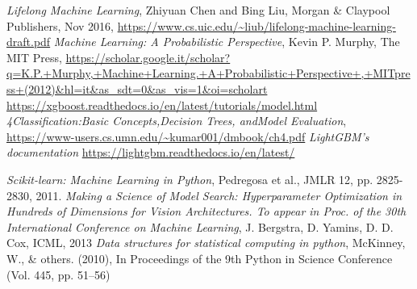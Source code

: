 \documentclass[a4paper, oneside, 11pt, openright]{book}
\begin{document}
\begin{thebibliography}{32}
			 \textit{Lifelong Machine Learning}, Zhiyuan Chen and Bing Liu, Morgan \& Claypool Publishers, Nov 2016, \url{https://www.cs.uic.edu/~liub/lifelong-machine-learning-draft.pdf}
			 \textit{Machine Learning: A Probabilistic Perspective}, Kevin P. Murphy, The MIT Press, \url{https://scholar.google.it/scholar?q=K.P.+Murphy,+Machine+Learning.+A+Probabilistic+Perspective+,+MITpress+(2012)&hl=it&as_sdt=0&as_vis=1&oi=scholart}
			 \url{https://xgboost.readthedocs.io/en/latest/tutorials/model.html}
			 \textit{4Classification:Basic Concepts,Decision Trees, andModel Evaluation}, \url{https://www-users.cs.umn.edu/~kumar001/dmbook/ch4.pdf}
			 \textit{LightGBM’s documentation} 
			\url{https://lightgbm.readthedocs.io/en/latest/}
			
			
			\textit{Scikit-learn: Machine Learning in Python}, Pedregosa et al., JMLR 12, pp. 2825-2830, 2011.
			\textit{Making a Science of Model Search: Hyperparameter Optimization in Hundreds of Dimensions for Vision Architectures. To appear in Proc. of the 30th International Conference on Machine Learning}, J. Bergstra, D. Yamins, D. D. Cox, ICML, 2013
			\textit{Data structures for statistical computing in python},
			McKinney, W., \& others. (2010), In Proceedings of the 9th Python in Science Conference (Vol. 445, pp. 51–56)
			
			
	\end{thebibliography}
\end{document}
